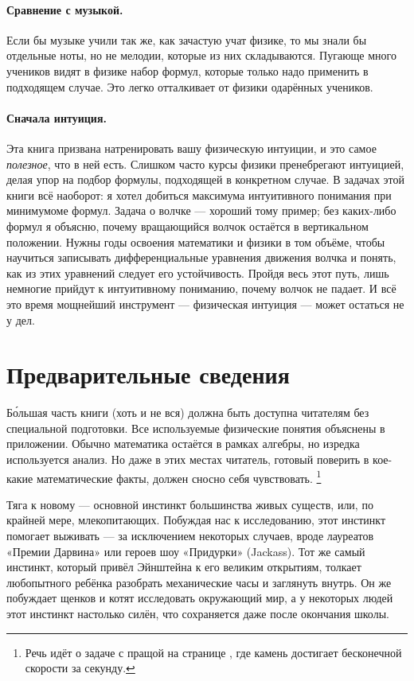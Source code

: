 \paragraph*{Сравнение с музыкой.}
Если бы музыке учили так же, как зачастую учат физике, то мы знали бы отдельные ноты, но не мелодии, которые из них складываются.
Пугающе много учеников видят в физике набор формул, которые только надо применить в подходящем случае.
Это легко отталкивает от физики одарённых учеников.

\paragraph*{Сначала интуиция.}
Эта книга призвана натренировать вашу физическую интуиции, и это самое \emph{полезное}, что в ней есть.
Слишком часто курсы физики пренебрегают интуицией, делая упор на подбор формулы, подходящей в конкретном случае.
В задачах этой книги всё наоборот:
я хотел добиться максимума интуитивного понимания при минимумоме формул.
Задача о волчке --- хороший тому пример;
без каких-либо формул я объясню, почему вращающийся волчок остаётся в вертикальном положении.
Нужны годы освоения математики и физики в том объёме, чтобы научиться записывать дифференциальные уравнения движения волчка и понять, как из этих уравнений следует его устойчивость.
Пройдя весь этот путь, лишь немногие прийдут к интуитивному пониманию, почему волчок не падает.
И всё это время мощнейший инструмент --- физическая интуиция --- может остаться не у дел.

\section{Предварительные сведения}

Б\'{о}льшая часть книги (хоть и не вся) должна быть доступна читателям без специальной подготовки.
Все используемые физические понятия объяснены в приложении.
Обычно математика остаётся в рамках алгебры, но изредка используется анализ.
Но даже в этих местах читатель, готовый поверить в кое-какие математические факты, должен сносно себя чувствовать.%
\footnote{Речь идёт о задаче с пращой на странице \pageref{???}, где камень достигает бесконечной скорости за секунду.}

Тяга к новому — основной инстинкт большинства живых существ, или, по крайней мере, млекопитающих.
Побуждая нас к исследованию, этот инстинкт помогает выживать — за исключением некоторых случаев, вроде лауреатов «Премии Дарвина» или героев шоу «Придурки» (Jackass).
Тот же самый инстинкт, который привёл Эйнштейна к его великим открытиям, толкает любопытного ребёнка разобрать механические часы и заглянуть внутрь.
Он же побуждает щенков и котят исследовать окружающий мир,
а у некоторых людей этот инстинкт настолько силён, что сохраняется даже после окончания школы.

